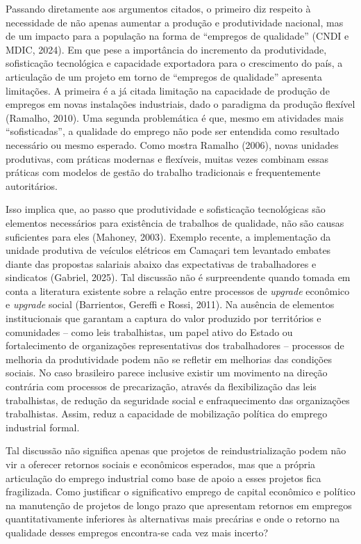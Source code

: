 Passando diretamente aos argumentos citados, o primeiro diz respeito à
necessidade de não apenas aumentar a produção e produtividade nacional,
mas de um impacto para a população na forma de ``empregos de qualidade''
(CNDI e MDIC, 2024). Em que pese a importância do incremento da
produtividade, sofisticação tecnológica e capacidade exportadora para o
crescimento do país, a articulação de um projeto em torno de ``empregos
de qualidade'' apresenta limitações. A primeira é a já citada limitação
na capacidade de produção de empregos em novas instalações industriais,
dado o paradigma da produção flexível (Ramalho, 2010). Uma segunda
problemática é que, mesmo em atividades mais ``sofisticadas'', a
qualidade do emprego não pode ser entendida como resultado necessário ou
mesmo esperado. Como mostra Ramalho (2006), novas unidades produtivas,
com práticas modernas e flexíveis, muitas vezes combinam essas práticas
com modelos de gestão do trabalho tradicionais e frequentemente
autoritários.

Isso implica que, ao passo que produtividade e sofisticação tecnológicas
são elementos necessários para existência de trabalhos de qualidade, não
são causas suficientes para eles (Mahoney, 2003). Exemplo recente, a
implementação da unidade produtiva de veículos elétricos em Camaçari tem
levantado embates diante das propostas salariais abaixo das expectativas
de trabalhadores e sindicatos (Gabriel, 2025). Tal discussão não é
surpreendente quando tomada em conta a literatura existente sobre a
relação entre processos de \emph{upgrade} econômico e \emph{upgrade}
social (Barrientos, Gereffi e Rossi, 2011). Na ausência de elementos
institucionais que garantam a captura do valor produzido por territórios
e comunidades -- como leis trabalhistas, um papel ativo do Estado ou
fortalecimento de organizações representativas dos trabalhadores --
processos de melhoria da produtividade podem não se refletir em
melhorias das condições sociais. No caso brasileiro parece inclusive
existir um movimento na direção contrária com processos de precarização,
através da flexibilização das leis trabalhistas, de redução da
seguridade social e enfraquecimento das organizações trabalhistas.
Assim, reduz a capacidade de mobilização política do emprego industrial
formal.

Tal discussão não significa apenas que projetos de reindustrialização
podem não vir a oferecer retornos sociais e econômicos esperados, mas
que a própria articulação do emprego industrial como base de apoio a
esses projetos fica fragilizada. Como justificar o significativo emprego
de capital econômico e político na manutenção de projetos de longo prazo
que apresentam retornos em empregos quantitativamente inferiores às
alternativas mais precárias e onde o retorno na qualidade desses
empregos encontra-se cada vez mais incerto?

